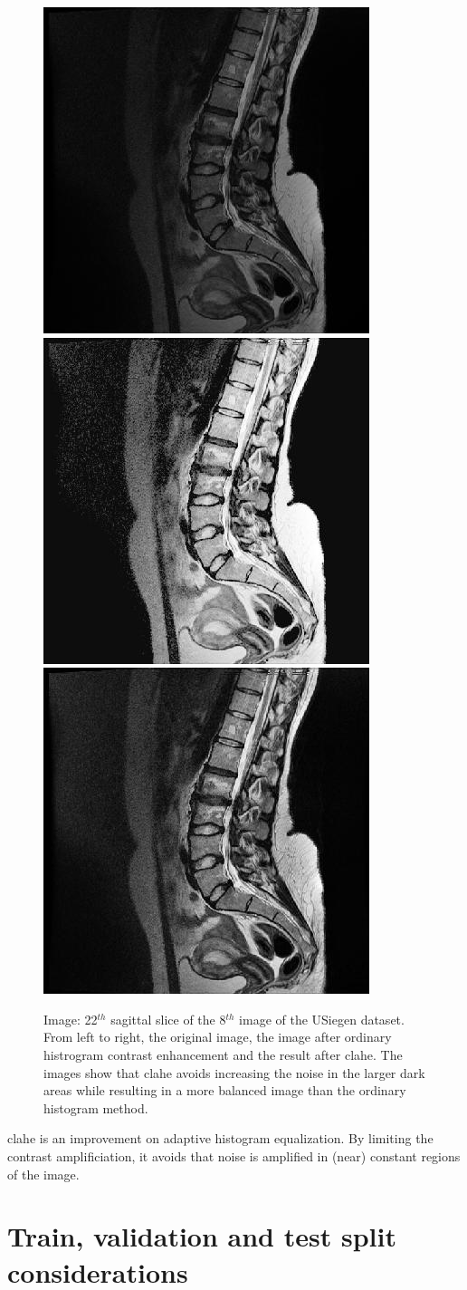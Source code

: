 \begin{figure}
    \centering
    \includegraphics[width=.32\textwidth]{images/orig_usieg8_s22.jpg}
    \includegraphics[width=.32\textwidth]{images/hist_usieg8_s22.jpg}
    \includegraphics[width=.32\textwidth]{images/clahe_usieg8_s22.jpg}
    \caption{Image: 22$^{th}$ sagittal slice of the 8$^{th}$ image of the USiegen dataset. 
    From left to right, the original image, the image after ordinary histrogram contrast enhancement and the result after \acrshort{clahe}.
    The images show that \acrshort{clahe} avoids increasing the noise in the larger dark areas while resulting in a more balanced image than the ordinary histogram method.
    }
\end{figure}

\acrfull{clahe} is an improvement on adaptive histogram equalization.
By limiting the contrast amplificiation, it avoids that noise is amplified in (near) constant regions of the image.


\section{Train, validation and test split considerations}

